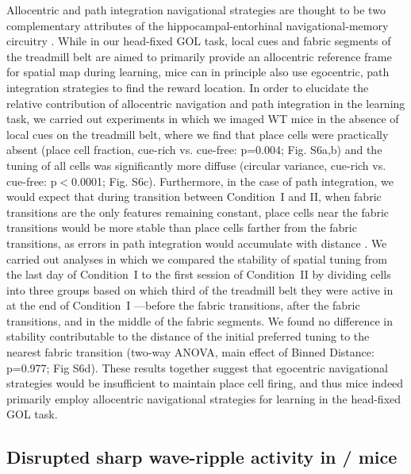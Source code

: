 Allocentric and path integration navigational strategies are thought to be two complementary attributes of the hippocampal-entorhinal navigational-memory circuitry \citep{Buzsaki2013, Etienne2004, Gothard1996, Moser2015}. While in our head-fixed GOL task, local cues and fabric segments of the treadmill belt are aimed to primarily provide an allocentric reference frame for spatial map during learning, mice can in principle also use egocentric, path integration strategies to find the reward location. In order to elucidate the relative contribution of allocentric navigation and path integration in the learning task, we carried out experiments in which we imaged WT mice in the absence of local cues on the treadmill belt, where we find that place cells were practically absent (place cell fraction, cue-rich vs. cue-free: p=0.004; Fig. S6a,b) and the tuning of all cells was significantly more diffuse (circular variance, cue-rich vs. cue-free: p$<$0.0001; Fig. S6c). Furthermore, in the case of path integration, we would expect that during transition between Condition~I and II, when fabric transitions are the only features remaining constant, place cells near the fabric transitions would be more stable than place cells farther from the fabric transitions, as errors in path integration would accumulate with distance \citep{Etienne2004, Gothard1996}. We carried out analyses in which we compared the stability of spatial tuning from the last day of Condition~I to the first session of Condition~II by dividing cells into three groups based on which third of the treadmill belt they were active in at the end of Condition~I —before the fabric transitions, after the fabric transitions, and in the middle of the fabric segments. We found no difference in stability contributable to the distance of the initial preferred tuning to the nearest fabric transition (two-way ANOVA, main effect of Binned Distance: p=0.977; Fig S6d). These results together suggest that egocentric navigational strategies would be insufficient to maintain place cell firing, and thus mice indeed primarily employ allocentric navigational strategies for learning in the head-fixed GOL task.

\subsection{Disrupted sharp wave-ripple activity in \df/ mice}\label{sec:df:results:SWR}

